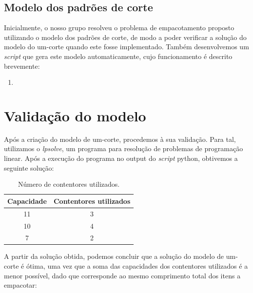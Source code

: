 \documentclass[12pt, a4paper, titlepage]{article}
\begin{document}

\subsection{Modelo dos padrões de corte}

Inicialmente, o nosso grupo resolveu o problema de empacotamento proposto utilizando o modelo dos
padrões de corte, de modo a poder verificar a solução do modelo do um-corte quando este fosse
implementado. Também desenvolvemos um \emph{script} que gera este modelo automaticamente, cujo
funcionamento é descrito brevemente:

\begin{enumerate}
	\item %
\end{enumerate}

\section{Validação do modelo}

Após a criação do modelo de um-corte, procedemos à sua validação. Para tal, utilizamos o
\emph{lpsolve}, um programa para resolução de problemas de programação linear.
Após a execução do programa no output do \emph{script} python, obtivemos a seguinte solução:

\begin{table}[H]
    \begin{center}
        \begin{tabular}{c|c}
            Capacidade & Contentores utilizados \\
            \hline
            11          & 3                     \\
            10          & 4                     \\
            7           & 2
        \end{tabular}
    \end{center}
    \caption{Número de contentores utilizados.}
	\label{containers-used}
\end{table}

A partir da solução obtida, podemos concluir que a solução do modelo de um-corte é ótima, uma vez
que a soma das capacidades dos contentores utilizados é a menor possível, dado que corresponde ao
mesmo comprimento total dos itens a empacotar:
\end{document}
